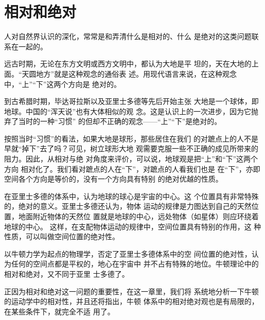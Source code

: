 \section{相对和绝对}\label{sec:02.01}

人对自然界认识的深化，常常是和弄清什么是相对的、什么
是绝对的这类问题联系在一起的。

远古时期，无论在东方文明或西方文明中，都认为大地是平
坦的，天在大地的上面。“天圆地方”就是这种观念的通俗表
述。用现代语言来说，在这种观念中，“上”“下”这两个方向是
绝对的。

到古希腊时期，毕达哥拉斯以及亚里士多德等先后开始主张
大地是一个球体，即地球。中国的“浑天说”也有大体相似的观
念。这是认识上的一次进步，因为它抛弃了当时的一种“习惯”
的但却不正确的观念——“上”“下”是绝对的。

按照当时“习惯”的看法，如果大地是球形，那些居住在我们
的对蹠点上的人不是早就“掉下”去了吗？可见，树立球形大地
观需要克服一些不正确的成见所带来的阻力。因此，从相对与绝
对角度来评价，可以说，地球观是把“上”和“下”这两个方向
相对化了。我们看对蹠点的人在“下”，对蹠点的人看我们也是
在“下”，亦即空间各个方向是等价的，没有一个方向具有特别
的绝对优越的性质。

在亚里士多德的体系中，认为地球的球心是宇宙的中心。这
个位置具有非常特殊的，绝对的意义。亚里士多德还认为，物体
运动的规律是力图达到自己的天然位置，地面附近物体的天然位
置就是地球的中心，远处物体（如星体）则应环绕着地球的中心。
这样，在支配物体运动的规律中，空间位置具有特别的作用，这
种性质，可以叫做空间位置的绝对性。

以牛顿力学为起点的物理学，否定了亚里士多德体系中的空
间位置的绝对性，认为任何的空间点都是平权的，地心在宇宙中
并不占有特殊的地位。牛顿理论中的相对和绝对，又不同于亚里
士多德了。

正因为相对和绝对这一问题的重要性，在这一章里，我们将
系统地分析一下牛顿的运动学中的相对性，并且还将指出，牛顿
体系中的相对绝对观也是有局限的，在某些条件下，就完全不适
用了。
